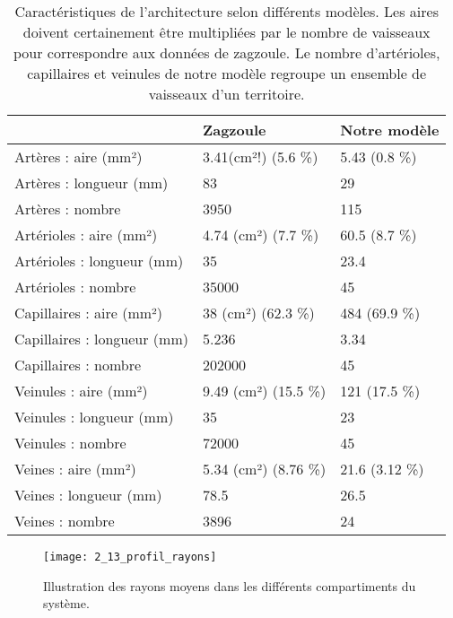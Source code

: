 \begin{table}
\caption{Caractéristiques de l'architecture selon différents modèles. Les aires doivent certainement être multipliées par le nombre de vaisseaux pour correspondre aux données de zagzoule. Le nombre d'artérioles, capillaires et veinules de notre modèle regroupe un ensemble de vaisseaux d'un territoire.}
\label{tab:tab_profil_rayons}
\begin{tabular}[!t]{l|l l}
\centering
      & Zagzoule & Notre modèle  \\
\hline
   Artères : aire (mm²) & 3.41(cm²!) (5.6 \%)&  5.43  (0.8 \%) \\
   Artères : longueur (mm) & 83 &  29 \\
   Artères : nombre & 3950 &  115 \\
   Artérioles : aire (mm²) & 4.74 (cm²)  (7.7 \%)&  60.5  (8.7 \%)\\
   Artérioles : longueur (mm) & 35 &  23.4 \\
   Artérioles : nombre & 35000 &  45 \\
   Capillaires : aire (mm²) & 38 (cm²)  (62.3 \%)&  484  (69.9 \%)\\
   Capillaires : longueur (mm) & 5.236 &  3.34 \\
   Capillaires : nombre & 202000 &  45 \\
   Veinules : aire (mm²) & 9.49 (cm²)  (15.5 \%)& 121  (17.5 \%)\\
   Veinules : longueur (mm) & 35 &  23 \\
   Veinules : nombre & 72000 &  45 \\
   Veines : aire (mm²) & 5.34 (cm²)  (8.76 \%)& 21.6  (3.12 \%)\\
   Veines : longueur (mm) & 78.5 &  26.5 \\
   Veines : nombre & 3896 &  24 \\
\hline

\end{tabular}
\end{table}
\begin{figure}[!t]
\centering
\texttt{[image: 2\_13\_profil\_rayons]}
\caption{Illustration des rayons moyens dans les différents compartiments du système.}
\label{fig:2_13_profil_rayons}	
\end{figure}	

